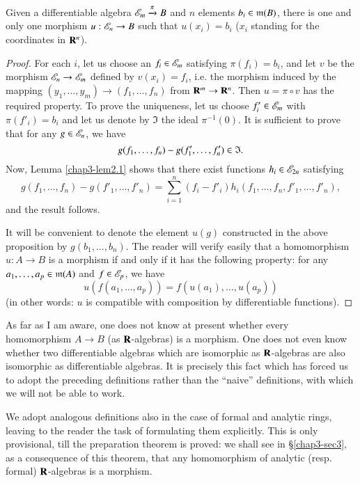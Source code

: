 \begin{proposition}\label{chap3-prop2.3}
Given a differentiable algebra $\mathscr{E}_{m}\xrightarrow{\pi}B$ and $n$ elements $b_{i}\in \mathfrak{m}(B)$, there is one and only one morphism $u:\mathscr{E}_{n}\to B$ such that $u(x_{i})=b_{i}$ ($x_{i}$ standing for the coordinates in $\mathbf{R}^{n}$).
\end{proposition}

\begin{proof}
For each $i$, let us choose an $f_{i}\in \mathscr{E}_{m}$ satisfying $\pi(f_{i})=b_{i}$, and let $v$ be the morphism $\mathscr{E}_{n}\to \mathscr{E}_{m}$ defined by $v(x_{i})=f_{i}$, i.e. the morphism induced by the mapping $(y_{1},\ldots,y_{m})\to (f_{1},\ldots,f_{n})$ from $\mathbf{R}^{m}\to \mathbf{R}^{n}$. Then $u=\pi\circ v$ has the required property. To prove the uniqueness, let us choose $f'_{i}\in \mathscr{E}_{m}$ with $\pi(f'_{i})=b_{i}$ and let us denote by $\mathfrak{I}$ the ideal $\pi^{-1}(0)$. It is sufficient to prove that for any $g\in \mathscr{E}_{n}$, we have
$$
g(f_{1},\ldots,f_{n})-g(f'_{1},\ldots,f'_{n})\in \mathfrak{I}.
$$
Now, Lemma \ref{chap3-lem2.1} shows that there exist functions $h_{i}\in \mathscr{E}_{2n}$ satisfying
$$
g(f_{1},\ldots,f_{n})-g(f'_{1},\ldots,f'_{n})=\sum\limits^{n}_{i=1}(f_{i}-f'_{i})h_{i}(f_{1},\ldots,f_{n},f'_{1},\ldots,f'_{n}),
$$
and the result follows.

It will be convenient to denote the element $u(g)$ constructed in the above proposition by $g(b_{1},\ldots,b_{n})$. The reader will verify easily that a homomorphism $u:A\to B$ is a morphism if and only if it has the following property: for any $a_{1},\ldots,a_{p}\in \mathfrak{m}(A)$ and $f\in\mathscr{E}_{p}$, we have
$$
u(f(a_{1},\ldots,a_{p}))=f(u(a_{1}),\ldots,u(a_{p}))
$$
(in other words: $u$ is compatible with composition by differentiable functions).
\end{proof}

\begin{remark}\label{chap3-rem2.4}
As far as I am aware, one does not know at present whether every homomorphism $A\to B$ (as $\mathbf{R}$-algebras) is a morphism. One does not even know whether two differentiable algebras which are isomorphic as $\mathbf{R}$-algebras are also isomorphic as differentiable algebras. It is precisely this fact which has forced us to adopt the preceding definitions rather than the ``naive'' definitions, with which we will not be able to work.

We adopt analogous definitions also in the case of formal and analytic rings, leaving to the reader the task of formulating them explicitly. This is only provisional, till the preparation theorem is proved: we shall see in \S\ref{chap3-sec3}, as a consequence of this theorem, that any homomorphism of analytic (resp. formal) $\mathbf{R}$-algebras is a morphism.
\end{remark}

